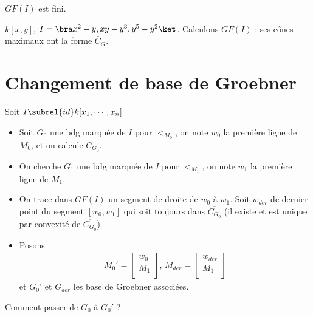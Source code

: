             \begin{coro}
                $GF(I)$ est fini.
            \end{coro}
            \begin{expl}
                $k[x,y]$, $I = \bra x^2 - y, xy - y^3, y^5 - y^2 \ket$. Calculons $GF(I)$ : ses cônes maximaux ont la forme $\bar C_G$.
            \end{expl}

        \section{Changement de base de Groebner}
        Soit $I \subrel{id} k[x_1, \cdots, x_n]$
        \begin{itemize}
            \item Soit $G_0$ une bdg marquée de $I$ pour $<_{M_0}$, on note $w_0$ la première ligne de $M_0$, et on calcule $C_{G_0}$.
            \item On cherche $G_1$ une bdg marquée de $I$ pour $<_{M_1}$, on note $w_1$ la première ligne de $M_1$.
            \item On trace dans $GF(I)$ un segment de droite de $w_0$ à $w_1$. Soit $w_{der}$ de dernier point du segment $[w_0, w_1]$ qui soit toujours dans $\overline{C_{G_0}}$ (il existe et est unique par convexité de $\overline{C_{G_0}}$).
            \item Posons
            \begin{align*}
                M_0' =
                \begin{bmatrix}
                    w_0 \\
                    M_1 \\
                \end{bmatrix}
                ,\, M_{der} =
                \begin{bmatrix}
                    w_{der} \\
                    M_1 \\
                \end{bmatrix}
            \end{align*}
            et $G_0'$ et $G_{der}$ les base de Groebner associées.
        \end{itemize}
        Comment passer de $G_0$ à $G_0'$ ?
        
